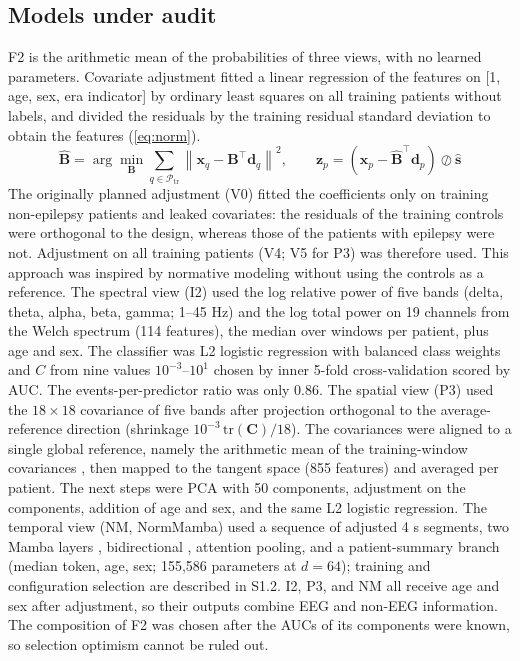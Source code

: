 \subsection{Models under audit}\label{sec:model}

F2 is the arithmetic mean of the probabilities of three views, with no learned parameters.
Covariate adjustment fitted a linear regression of the features on [1, age, sex, era indicator] by ordinary least squares on all training patients without labels, and divided the residuals by the training residual standard deviation to obtain the features (\eqref{eq:norm}).
\begin{equation}\label{eq:norm}
\hat{\mathbf{B}}=\arg\min_{\mathbf{B}}\sum_{q\in\mathcal{P}_{\mathrm{tr}}}\left\|\mathbf{x}_q-\mathbf{B}^{\top}\mathbf{d}_q\right\|^{2},\qquad
\mathbf{z}_p=\left(\mathbf{x}_p-\hat{\mathbf{B}}^{\top}\mathbf{d}_p\right)\oslash\hat{\mathbf{s}}
\end{equation}
The originally planned adjustment (V0) fitted the coefficients only on training non-epilepsy patients and leaked covariates: the residuals of the training controls were orthogonal to the design, whereas those of the patients with epilepsy were not. Adjustment on all training patients (V4; V5 for P3) was therefore used. This approach was inspired by normative modeling \cite{rutherford2022,rutherford2023} without using the controls as a reference.
The spectral view (I2) used the log relative power of five bands (delta, theta, alpha, beta, gamma; 1--45 Hz) and the log total power on 19 channels from the Welch spectrum (114 features), the median over windows per patient, plus age and sex. The classifier was L2 logistic regression with balanced class weights and $C$ from nine values $10^{-3}$--$10^{1}$ chosen by inner 5-fold cross-validation scored by AUC. The events-per-predictor ratio was only 0.86.
The spatial view (P3) used the $18\times18$ covariance of five bands after projection orthogonal to the average-reference direction (shrinkage $10^{-3}\,\mathrm{tr}(\mathbf{C})/18$). The covariances were aligned to a single global reference, namely the arithmetic mean of the training-window covariances \cite{zanini2018,he2020}, then mapped to the tangent space (855 features) and averaged per patient. The next steps were PCA with 50 components, adjustment on the components, addition of age and sex, and the same L2 logistic regression.
The temporal view (NM, NormMamba) used a sequence of adjusted 4 s segments, two Mamba layers \cite{gu2023}, bidirectional \cite{wang2025eegmamba}, attention pooling, and a patient-summary branch (median token, age, sex; 155,586 parameters at $d=64$); training and configuration selection are described in S1.2. I2, P3, and NM all receive age and sex after adjustment, so their outputs combine EEG and non-EEG information. The composition of F2 was chosen after the AUCs of its components were known, so selection optimism cannot be ruled out.

